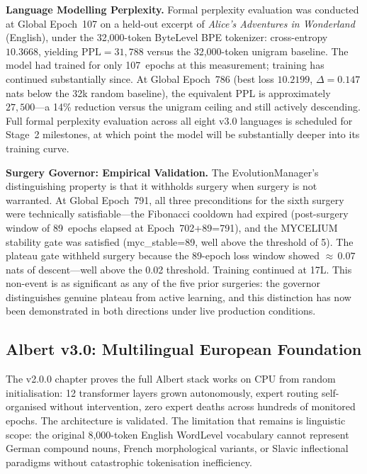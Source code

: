 \documentclass[journal,10pt,twocolumn]{IEEEtran}
\begin{document}
\textbf{Language Modelling Perplexity.}
Formal perplexity evaluation was conducted at Global Epoch~107 on a held-out
excerpt of \emph{Alice's Adventures in Wonderland} (English), under the
32{,}000-token ByteLevel BPE tokenizer: cross-entropy $10.3668$, yielding
$\text{PPL} = 31{,}788$ versus the 32{,}000-token unigram baseline.
The model had trained for only 107~epochs at this measurement; training
has continued substantially since. At Global Epoch~786 (best loss $10.2199$,
$\Delta = 0.147$ nats below the 32k random baseline), the equivalent PPL
is approximately $27{,}500$---a 14\% reduction versus the unigram ceiling
and still actively descending. Full formal perplexity evaluation across all
eight v3.0 languages is scheduled for Stage~2 milestones, at which point the
model will be substantially deeper into its training curve.

\textbf{Surgery Governor: Empirical Validation.}
The EvolutionManager's distinguishing property is that it withholds surgery
when surgery is not warranted. At Global Epoch~791, all three preconditions
for the sixth surgery were technically satisfiable---the Fibonacci cooldown
had expired (post-surgery window of 89~epochs elapsed at Epoch~702+89=791),
and the MYCELIUM stability gate was satisfied (myc\_stable=89, well above
the threshold of 5). The plateau gate withheld surgery because the 89-epoch
loss window showed ${\approx}\,0.07$ nats of descent---well above the 0.02
threshold. Training continued at 17L. This non-event is as significant as
any of the five prior surgeries: the governor distinguishes genuine plateau
from active learning, and this distinction has now been demonstrated in
both directions under live production conditions.

\subsection{Albert v3.0: Multilingual European Foundation}
\label{subsec:albert_v3}

The v2.0.0 chapter proves the full Albert stack works on CPU from random
initialisation: 12 transformer layers grown autonomously, expert routing
self-organised without intervention, zero expert deaths across hundreds
of monitored epochs. The architecture is validated. The limitation that
remains is linguistic scope: the original 8{,}000-token English WordLevel
vocabulary cannot represent German compound nouns, French morphological
variants, or Slavic inflectional paradigms without catastrophic
tokenisation inefficiency.
\end{document}
